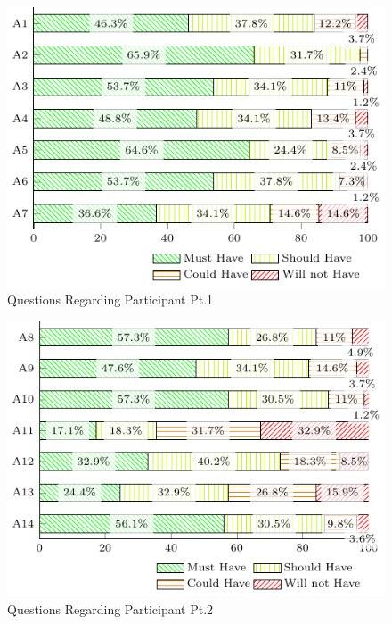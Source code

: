\begin{figure}[!htb]
  \caption{Questions Regarding Participant Pt.1}\label{fig:participant-1}
  \begin{center}
    \includegraphics[width=13cm]{img/5-questions-participant-1.pdf}
  \end{center}
\end{figure}

\begin{figure}[!htb]
  \caption{Questions Regarding Participant Pt.2}\label{fig:participant-2}
  \begin{center}
    \includegraphics[width=13cm]{img/5-questions-participant-2.pdf}
  \end{center}
\end{figure}


